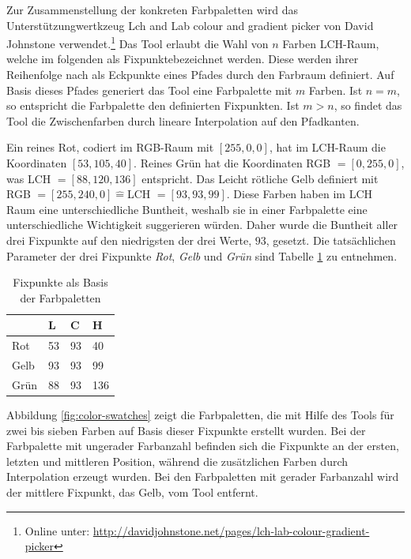 Zur Zusammenstellung der konkreten Farbpaletten wird das Unterstützungwertkzeug \glqq Lch and Lab colour and gradient picker\grqq{} von David Johnstone verwendet.\footnote{Online unter: \url{http://davidjohnstone.net/pages/lch-lab-colour-gradient-picker}} Das Tool erlaubt die Wahl von $n$ Farben LCH-Raum, welche im folgenden als \glqq Fixpunkte\grqq bezeichnet werden. Diese werden ihrer Reihenfolge nach als Eckpunkte eines Pfades durch den Farbraum definiert. Auf Basis dieses Pfades generiert das Tool eine Farbpalette mit $m$ Farben. Ist $n = m$, so entspricht die Farbpalette den definierten Fixpunkten. Ist $m > n$, so findet das Tool die Zwischenfarben durch lineare Interpolation auf den Pfadkanten.

Ein \glqq reines Rot\grqq, codiert im RGB-Raum mit $[255,0,0]$, hat im LCH-Raum die Koordinaten $[53,105,40]$. \glqq Reines Grün\grqq{} hat die Koordinaten RGB $=[0,255,0]$, was LCH $= [88,120,136]$ entspricht. Das \glqq Leicht rötliche Gelb\grqq{} definiert mit RGB $=[255,240,0] \hat{=}$LCH $= [93,93,99]$. Diese Farben haben im LCH Raum eine unterschiedliche Buntheit, weshalb  sie in einer  Farbpalette eine unterschiedliche Wichtigkeit suggerieren würden.\cite{bigman} Daher wurde die Buntheit aller drei Fixpunkte auf den niedrigsten der drei Werte, $93$, gesetzt. Die tatsächlichen Parameter der drei Fixpunkte \emph{Rot}, \emph{Gelb} und \emph{Grün} sind Tabelle \ref{tab:fixpoints} zu entnehmen. 

\begin{table}[h]
\centering
\caption{Fixpunkte als Basis der Farbpaletten}
\label{tab:fixpoints}
\begin{tabular}{@{}llll@{}}
\toprule
                                     & L      & C     & H      \\ \midrule
Rot   & 53     & 93    & 40     \\
Gelb  & 93     & 93    & 99     \\
Grün  & 88     & 93    & 136    \\ \bottomrule
\end{tabular}
\end{table}

Abbildung \ref{fig:color-swatches} zeigt die Farbpaletten, die mit Hilfe des Tools für zwei bis sieben Farben auf Basis dieser Fixpunkte erstellt wurden. Bei der Farbpalette mit ungerader Farbanzahl befinden sich die Fixpunkte an der ersten, letzten und mittleren Position, während die zusätzlichen Farben durch Interpolation erzeugt wurden. Bei den Farbpaletten mit gerader Farbanzahl wird der mittlere Fixpunkt, das Gelb, vom Tool entfernt.

